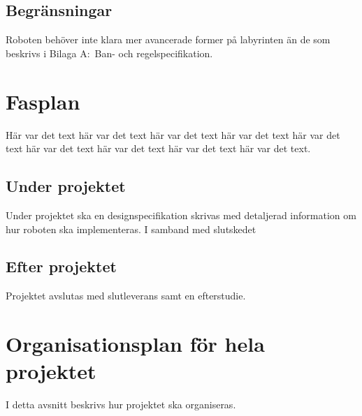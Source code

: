 \documentclass[a4paper,titlepage,12pt]{article}
\begin{document}
	
	\subsection{Begränsningar}
	Roboten behöver inte klara mer avancerade former på labyrinten än de som
    beskrivs i Bilaga A:\ Ban- och regelspecifikation.
	
	
	\section{Fasplan}
	Här var det text här var det text här var det text
	här var det text här var det text här var det text
	här var det text här var det text här var det text.
	
	
	
	\subsection{Under projektet}
	Under projektet ska en designspecifikation skrivas med detaljerad
    information om hur roboten ska implementeras. I samband med slutskedet

	
	\subsection{Efter projektet}
    Projektet avslutas med slutleverans samt en efterstudie.
	
	
	\section{Organisationsplan för hela projektet}
    I detta avsnitt beskrivs hur projektet ska organiseras.
\end{document}
